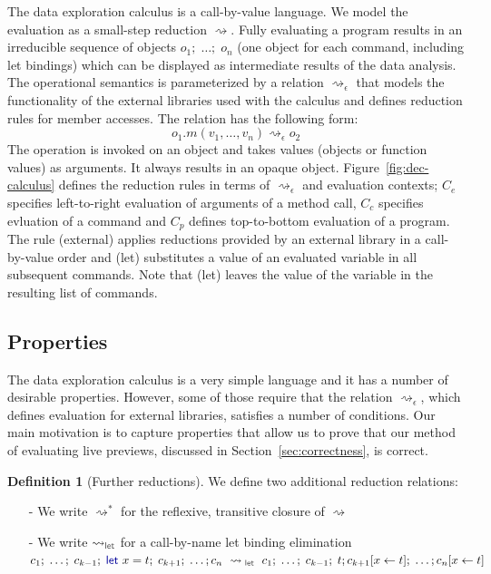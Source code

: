 \documentclass[acmsmall,anonymous,fleqn]{acmart}\settopmatter{printfolios=false,printccs=false,printacmref=false}
\newcounter{dfc}
\theoremstyle{plain}
\theoremstyle{definition}
\newtheorem{definition}[dfc]{Definition}
\newcommand{\ident}[1]{\textnormal{\textcolor{idclr}{\sffamily #1}}}
\newcommand{\kvd}[1]{\textnormal{\textcolor{kvdclr}{\sffamily #1}}}
\newcommand{\rname}[1]{{\sffamily\small(#1)}}
\begin{document}
The data exploration calculus is a call-by-value language. We model the evaluation as a small-step
reduction $\rightsquigarrow$. Fully evaluating a program results in an irreducible sequence of
objects $o_1;\; \ldots;\; o_n$ (one object for each command, including let bindings) which can be
displayed as intermediate results of the data analysis. The operational semantics is parameterized
by a relation $\rightsquigarrow_\epsilon$ that models the functionality of the external libraries
used with the calculus and defines reduction rules for member accesses. The relation has the
following form:
%
\begin{equation*}
o_1.m(v_1, \ldots, v_n) \rightsquigarrow_\epsilon o_2
\end{equation*}
%
The operation is invoked on an object and takes values (objects or function values) as arguments.
It always results in an opaque object.
Figure~\ref{fig:dec-calculus} defines the reduction rules in terms of $\rightsquigarrow_\epsilon$
and evaluation contexts; $C_e$ specifies left-to-right evaluation of arguments of a method call,
$C_c$ specifies evluation of a command and $C_p$ defines top-to-bottom evaluation of a program.
The rule \rname{external} applies reductions provided by an external library in a
call-by-value order and \rname{let} substitutes a value of an evaluated variable in
all subsequent commands. Note that \rname{let} leaves the value of the variable
in the resulting list of commands.

\subsection{Properties}
The data exploration calculus is a very simple language and it has a number of desirable
properties. However, some of those require that the relation $\rightsquigarrow_\epsilon$, which
defines evaluation for external libraries, satisfies a number of conditions. Our main motivation
is to capture properties that allow us to prove that our method of evaluating live previews,
discussed in Section~\ref{sec:correctness}, is correct.

\begin{definition}[Further reductions]
\label{def:further-red}
We define two additional reduction relations:
\begin{itemize}
\item[-] We write $\rightsquigarrow^{*}$ for the reflexive, transitive closure of $\rightsquigarrow$
\item[-] We write $\rightsquigarrow_\ident{let}$ for a call-by-name let binding elimination\\
  $c_1;\; \ldots;\; c_{k-1};\; \kvd{let}~x=t;\; c_{k+1};\; \ldots; c_n ~\rightsquigarrow_\ident{let}~
  c_1;\; \ldots;\; c_{k-1};\; t; c_{k+1}[x\leftarrow t];\; \ldots; c_n[x\leftarrow t]$
\end{itemize}
\end{definition}
\end{document}
